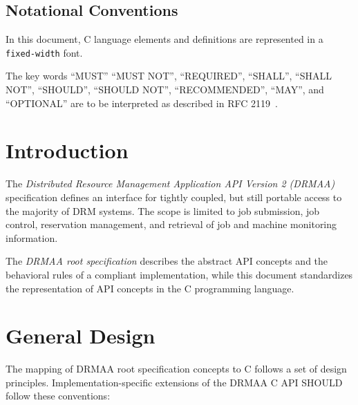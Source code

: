 \documentclass{article}
\newcommand{\h}[1]{\texttt{#1}}
\begin{document}

\subsection*{Notational Conventions}
\label{sec:rfc2119}

In this document, C language elements and definitions are represented in a \h{fixed-width} font. 

The key words \enquote{MUST} \enquote{MUST NOT}, \enquote{REQUIRED}, \enquote{SHALL}, \enquote{SHALL NOT}, \enquote{SHOULD}, \enquote{SHOULD NOT}, \enquote{RECOMMENDED}, \enquote{MAY},  and \enquote{OPTIONAL} are to be interpreted as described in RFC 2119~\cite{rfc2119}. 

\newpage
\tableofcontents
\newpage

\section{Introduction}
\label{sec:introduction}

 The \emph{Distributed Resource Management Application API Version 2 (DRMAA)} specification defines an interface for tightly coupled, but still portable access to the majority of DRM systems. The scope is limited to job submission, job control, reservation management, and retrieval of job and machine monitoring information. 

The \emph{DRMAA root specification} \cite{gfd194} describes the abstract API concepts and the behavioral rules of a compliant implementation, while this document standardizes the representation of API concepts in the C programming language.

\section{General Design}
\label{sec:concepts}

The mapping of DRMAA root specification concepts to C follows a set of design principles. Implementation-specific extensions of the DRMAA C API SHOULD follow these conventions:
\end{document}
